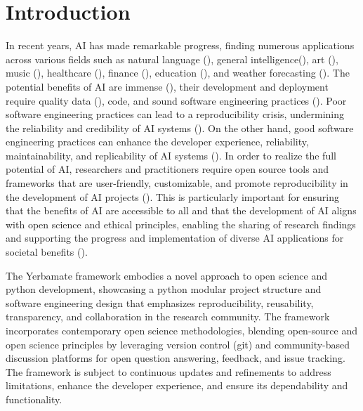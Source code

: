 
\section{Introduction}


 In recent years, AI has made remarkable progress, finding numerous applications across various fields such as natural language (\cite{gpt}), general intelligence(\cite{gato}), art (\cite{diffusion}), music (\cite{musiclm}), healthcare (\cite{aihealthcare}), finance (\cite{bao2022fraudartificial}), education (\cite{aieducation}), and weather forecasting (\cite{weather}). The potential benefits of AI are immense (\cite{beneficialai,potencialaibenefit}), their development and deployment require quality data (\cite{lecun2015deep}), code, and sound software engineering practices (\cite{se4dl,amershi2019software}). Poor software engineering practices can lead to a reproducibility crisis, undermining the reliability and credibility of AI systems (\cite{leakage-recrisis}). On the other hand, good software engineering practices can enhance the developer experience, reliability, maintainability, and replicability of AI systems (\cite{se4dl,amershi2019software, wan2019does}). In order to realize the full potential of AI, researchers and practitioners require open source tools and frameworks that are user-friendly, customizable, and promote reproducibility in the development of AI projects (\cite{lu2022softwareAIReponse,li2018can,wolf2020designing,olson2018system,ong2021guide,gundersen2018reproducible}). This is particularly important for ensuring that the benefits of AI are accessible to all and that the development of AI aligns with open science and ethical principles, enabling the sharing of research findings and supporting the progress and implementation of diverse AI applications for societal benefits (\cite{coro2020open,braun2018open, mittelstadt2016ethics,floridi2018ai4people,ong2021guide}).

The Yerbamate framework embodies a novel approach to open science and python development, showcasing a python modular project structure and software engineering design that emphasizes reproducibility, reusability, transparency, and collaboration in the research community. The framework incorporates contemporary open science methodologies, blending open-source and open science principles by leveraging version control (git) and community-based discussion platforms for open question answering, feedback, and issue tracking. The framework is subject to continuous updates and refinements to address limitations, enhance the developer experience, and ensure its dependability and functionality. 

